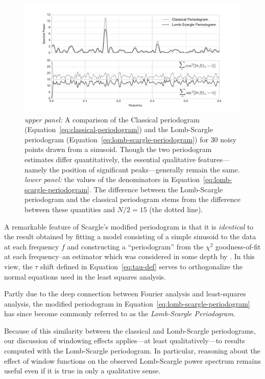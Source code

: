 \documentclass[preprint]{aastex}
\newcommand{\figlabel}[1]{\label{fig:#1}}
\newcommand{\Eq}[1]{Equation~\ref{eq:#1}}
\newcommand{\eq}[1]{\Eq{#1}}
\begin{document}
\begin{figure}[ht]
  \centering
  \includegraphics[width=\textwidth]{fig17_ls_comparison}
  \caption{{\it upper panel:} A comparison of the Classical periodogram
    (\eq{classical-periodogram}) and the Lomb-Scargle periodogram
    (\eq{lomb-scargle-periodogram}) for 30 noisy points drawn from a sinusoid.
    Though the two periodogram estimates differ quantitatively, the essential
    qualitative features---namely the position of significant peaks---generally
    remain the same.
    {\it lower panel:} the values of the denominators in
    \eq{lomb-scargle-periodogram}.
    The difference between the Lomb-Scargle periodogram and the classical
    periodogram stems from the difference between these quantities
    and $N/2 = 15$ (the dotted line).
    \figlabel{ls-comparison}}
\end{figure}

A remarkable feature of Scargle's modified periodogram is that it is
{\it identical} to the result
obtained by fitting a model consisting of a simple sinusoid to the data at
each frequency $f$ and
constructing a ``periodogram'' from the $\chi^2$ goodness-of-fit at each
frequency--an estimator which was considered in some depth by \citet{Lomb76}.
In this view, the $\tau$ shift defined in \eq{tau-def} serves to orthogonalize
the normal equations used in the least squares analysis.

Partly due to the deep connection between Fourier analysis and least-squares
analysis, the modified periodogram in \eq{lomb-scargle-periodogram}
has since become commonly referred to as the {\it Lomb-Scargle Periodogram}.

Because of this similarity between the classical and Lomb-Scargle periodograms,
our discussion of windowing effects applies---at least qualitatively---to
results computed with the Lomb-Scargle periodogram.
In particular, reasoning about the effect of window functions on the observed
Lomb-Scargle power spectrum remains useful even if it is true in only a
qualitative sense.
\end{document}

